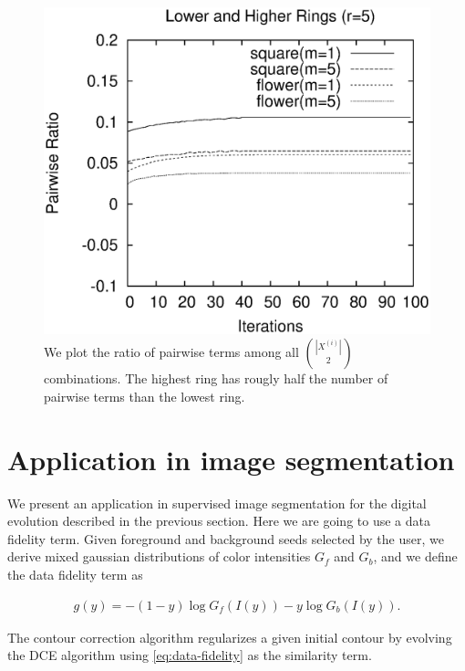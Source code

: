 \documentclass[runningheads]{llncs}
\begin{document}
\begin{figure}
\center
\includegraphics[scale=0.5]{images/optimization/pairwise-ratio/plot-pairwiseratio-lowerHigher-concavities-probe.eps}
\caption{We plot the ratio of pairwise terms among all $\binom{|X^{(i)}|}{2}$ combinations. The highest ring has rougly half the number of pairwise terms  than the lowest ring.}
\end{figure}



\section{Application in image segmentation}

We present an application in supervised image segmentation for the digital evolution described in the previous section. Here we are going to use a data fidelity term. Given foreground and background seeds selected by the user, we derive mixed gaussian distributions  of color intensities $G_f$ and $G_b$, and we define the data fidelity term as
	
	\begin{align}
		g(y) = -(1-y)\log{G_f(I(y))} - y\log{G_b(I(y))}.
		\label{eq:data-fidelity}
	\end{align}	
	
The contour correction algorithm regularizes a given initial contour by evolving the DCE algorithm using 
\eqref{eq:data-fidelity} as the similarity term.
	
\end{document}
